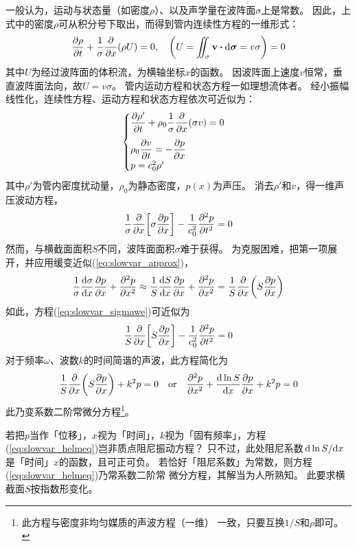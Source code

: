 \documentclass[UTF8]{ctexbook}
\begin{document}
一般认为，运动与状态量（如密度$\rho$）、以及声学量在波阵面$\sigma$上是常数。
因此，上式中的密度$\rho$可从积分号下取出，而得到管内连续性方程的一维形式：
$$
\pdv{\rho}{t} +\frac1\sigma \pdv{x} (\rho U) = 0\qc \qty(U = \iint_\sigma
\vb{v}\vdot \dd{\bm{\sigma}} = v\sigma) = 0$$
其中$U$为经过波阵面的体积流，为横轴坐标$x$的函数。
因波阵面上速度$v$恒常，垂直波阵面法向，故$U=v\sigma$。
管内运动方程和状态方程一如理想流体者。
经小振幅线性化，连续性方程、运动方程和状态方程依次可近似为：
$$
\begin{cases}
	\displaystyle \pdv{\rho'}{t} +\rho_0 \frac1\sigma \pdv{x}(\sigma v) = 0\\[1em]
\displaystyle \rho_0\pdv{v}{t} = -\pdv{p}{x}\\
p = c_0^2 \rho'
\end{cases}
$$
其中$\rho'$为管内密度扰动量，$\rho_0$为静态密度，$p(x)$为声压。
消去$\rho'$和$v$，得一维声压波动方程，
\begin{equation}
	\label{eq:slowvar_sigmawe}
	\frac1\sigma \pdv{x} \qty[\sigma \pdv{p}{x}]
	-\frac{1}{c_0^2} \pdv[2]{p}{t} =0
\end{equation}
然而，与横截面面积$S$不同，波阵面面积$\sigma$难于获得。
为克服困难，把第一项展开，并应用缓变近似(\ref{eq:slowvar_approx})，
$$
\frac{1}{\sigma}\dv{\sigma}{x} \pdv{p}{x}
+\pdv[2]{p}{x} \approx \frac1S \dv{S}{x} \pdv{p}{x}
+\pdv[2]{p}{x} =\frac1S \pdv{x}(S\pdv{p}{x})$$
如此，方程(\ref{eq:slowvar_sigmawe})可近似为
$$
\frac1S \pdv{x} \qty[S\pdv{p}{x}] -\frac{1}{c_0^2}
\pdv[2]{p}{t} = 0
$$
对于频率$\omega$、波数$k$的时间简谐的声波，此方程简化为
\begin{equation}
	\label{eq:slowvar_helmeq}
	\frac1S \pdv{x}\qty(S\pdv{p}{x}) +k^2p = 0
	\qor
	\pdv[2]{p}{x}+\dv{\ln S}{x} \pdv{p}{x}+k^2p=0
\end{equation}
此乃变系数二阶常微分方程\footnote{此方程与密度非均匀媒质的声波方程（一维）
一致，只要互换$1/S$和$\rho$即可。}。

若把$p$当作「位移」，$x$视为「时间」，$k$视为「固有频率」，方程
(\ref{eq:slowvar_helmeq})岂非质点阻尼振动方程？
只不过，此处阻尼系数$\dv*{\ln S}{x}$是「时间」$x$的函数，且可正可负。
若恰好「阻尼系数」为常数，则方程(\ref{eq:slowvar_helmeq})乃常系数二阶常
微分方程，其解当为人所熟知。
此要求横截面$S$按指数形变化。
\end{document}
